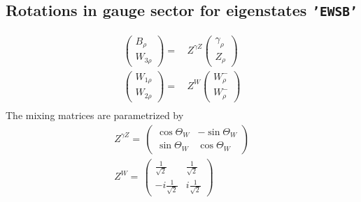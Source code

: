 \subsection{Rotations in gauge sector for eigenstates {\tt 'EWSB'} } 
\begin{align} 
\left(\begin{array}{c} 
B_{{\rho}}\\ 
W_{{3 \rho}}\end{array} \right) 
 = & \,Z^{\gamma Z}
\left(\begin{array}{c} 
\gamma_{{\rho}}\\ 
Z_{{\rho}}\end{array} \right) \\ 
\left(\begin{array}{c} 
W_{{1 \rho}}\\ 
W_{{2 \rho}}\end{array} \right) 
 = & \,Z^{W}
\left(\begin{array}{c} 
W^-_{{\rho}}\\ 
W^-_{{\rho}}\end{array} \right) \\ 
\end{align} 
The mixing matrices are parametrized by \\ 
\begin{align} 
Z^{\gamma Z}= \, \left( 
\begin{array}{cc} 
\cos\Theta_W  & - \sin\Theta_W   \\ 
 \sin\Theta_W  & \cos\Theta_W \end{array} 
\right) \\ 
Z^{W}= \, \left( 
\begin{array}{cc} 
\frac{1}{\sqrt{2}} & \frac{1}{\sqrt{2}} \\ 
 -i \frac{1}{\sqrt{2}}  & i \frac{1}{\sqrt{2}} \end{array} 
\right) \\ 
\end{align} 
